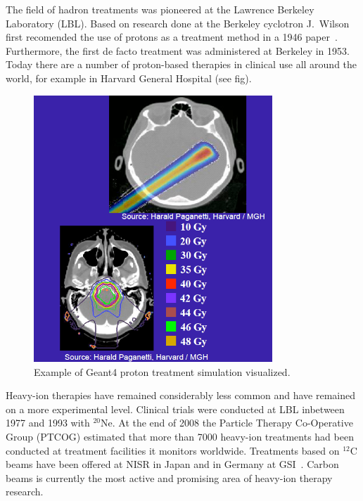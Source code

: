 The field of hadron treatments was pioneered at the Lawrence Berkeley Laboratory (LBL). Based on research done at the Berkeley cyclotron J.~Wilson first recomended the use of protons as a treatment method in a 1946 paper~\cite{RW46}. Furthermore, the first de facto treatment was administered at Berkeley in 1953. Today there are a number of proton-based therapies in clinical use all around the world, for example in Harvard General Hospital (see fig). %
\begin{figure}[h]
\begin{center}
\includegraphics[width=0.8\textwidth]{images/HarvardHadronTreatment.png}  
\caption{\label{fig:HarvardHadron} Example of Geant4 proton treatment simulation visualized.} 
\end{center}
\end{figure} 
Heavy-ion therapies have remained considerably less common and have remained on a more experimental level. Clinical trials were conducted at LBL inbetween 1977 and 1993 with $^{20}$Ne. At the end of 2008 the Particle Therapy Co-Operative  Group (PTCOG) estimated that more than 7000 heavy-ion treatments had been conducted at treatment facilities it monitors worldwide. Treatments based on $^{12}$C beams have been offered at NISR in Japan and in Germany at GSI~\cite{PTCOGstat}. Carbon beams is currently the most active and promising area of heavy-ion therapy research. 

